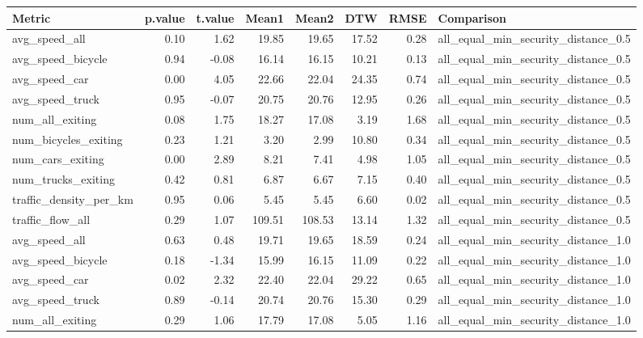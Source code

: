 \begin{table}[ht]
\centering
\begin{tabular}{lrrrrrrl}
  \hline
Metric & p.value & t.value & Mean1 & Mean2 & DTW & RMSE & Comparison \\ 
  \hline
avg\_speed\_all & 0.10 & 1.62 & 19.85 & 19.65 & 17.52 & 0.28 & all\_equal\_min\_security\_distance\_0.5 \\ 
  avg\_speed\_bicycle & 0.94 & -0.08 & 16.14 & 16.15 & 10.21 & 0.13 & all\_equal\_min\_security\_distance\_0.5 \\ 
  avg\_speed\_car & 0.00 & 4.05 & 22.66 & 22.04 & 24.35 & 0.74 & all\_equal\_min\_security\_distance\_0.5 \\ 
  avg\_speed\_truck & 0.95 & -0.07 & 20.75 & 20.76 & 12.95 & 0.26 & all\_equal\_min\_security\_distance\_0.5 \\ 
  num\_all\_exiting & 0.08 & 1.75 & 18.27 & 17.08 & 3.19 & 1.68 & all\_equal\_min\_security\_distance\_0.5 \\ 
  num\_bicycles\_exiting & 0.23 & 1.21 & 3.20 & 2.99 & 10.80 & 0.34 & all\_equal\_min\_security\_distance\_0.5 \\ 
  num\_cars\_exiting & 0.00 & 2.89 & 8.21 & 7.41 & 4.98 & 1.05 & all\_equal\_min\_security\_distance\_0.5 \\ 
  num\_trucks\_exiting & 0.42 & 0.81 & 6.87 & 6.67 & 7.15 & 0.40 & all\_equal\_min\_security\_distance\_0.5 \\ 
  traffic\_density\_per\_km & 0.95 & 0.06 & 5.45 & 5.45 & 6.60 & 0.02 & all\_equal\_min\_security\_distance\_0.5 \\ 
  traffic\_flow\_all & 0.29 & 1.07 & 109.51 & 108.53 & 13.14 & 1.32 & all\_equal\_min\_security\_distance\_0.5 \\ 
  avg\_speed\_all & 0.63 & 0.48 & 19.71 & 19.65 & 18.59 & 0.24 & all\_equal\_min\_security\_distance\_1.0 \\ 
  avg\_speed\_bicycle & 0.18 & -1.34 & 15.99 & 16.15 & 11.09 & 0.22 & all\_equal\_min\_security\_distance\_1.0 \\ 
  avg\_speed\_car & 0.02 & 2.32 & 22.40 & 22.04 & 29.22 & 0.65 & all\_equal\_min\_security\_distance\_1.0 \\ 
  avg\_speed\_truck & 0.89 & -0.14 & 20.74 & 20.76 & 15.30 & 0.29 & all\_equal\_min\_security\_distance\_1.0 \\ 
  num\_all\_exiting & 0.29 & 1.06 & 17.79 & 17.08 & 5.05 & 1.16 & all\_equal\_min\_security\_distance\_1.0 \\ 

\end{tabular}
\end{table}
